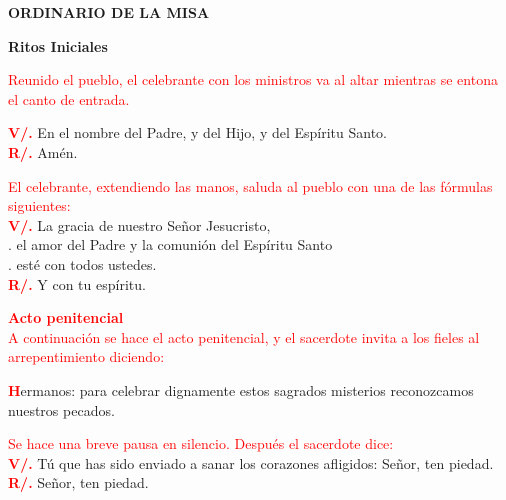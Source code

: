 \documentclass[12pt, letterpaper]{article}
\begin{document}

  \begin{center}
    \Huge {\bfseries ORDINARIO DE LA MISA}
  \end{center}

  \begin{center}
    \Huge {\bfseries Ritos Iniciales}
  \end{center}

  \large {\textcolor{red}{Reunido el pueblo, el celebrante con los ministros va al altar mientras se entona el canto de entrada.}}

  \noindent
  \Large {\bfseries \textcolor{red}{V/.}} \hspace{1cm} {En el nombre del Padre, y del Hijo, \Huge{\textcolor{red}{}} \Large y del Esp\'iritu Santo.}\\
  \noindent
  \Large{{\bfseries \textcolor{red}{R/.}} \hspace{1cm} Am\'en.}

  \large {\textcolor{red}{El celebrante, extendiendo las manos, saluda al pueblo con una de las f\'ormulas siguientes:}}\\
  \Large {\bfseries \textcolor{red}{V/.}} \hspace{1cm} La gracia de nuestro Se\~nor Jesucristo,\\
  . \hspace{1.9cm} el amor del Padre y la comuni\'on del Esp\'iritu Santo\\
  . \hspace{1.9cm} est\'e con todos ustedes.\\
  \noindent
  {\bfseries \textcolor{red}{R/.}} \hspace{1cm} \Large Y con tu esp\'iritu.

  \large {\bfseries \textcolor{red}{Acto penitencial}}\\
  \large {\textcolor{red}{A continuaci\'on se hace el acto penitencial, y el sacerdote invita a los fieles al arrepentimiento
  diciendo:}}

  \lettrine[lines=2]{\bfseries \textcolor{red}{H}}{}\Large {ermanos: para celebrar dignamente estos sagrados misterios reconozcamos nuestros pecados.}

  \large {\textcolor{red}{Se hace una breve pausa en silencio. Despu\'es el sacerdote dice:}}\\
  \Large {\bfseries \textcolor{red}{V/.}} \hspace{1cm} T\'u que has sido enviado a sanar los corazones afligidos: Se\~nor, ten piedad.\\
  \noindent
  \Large {\bfseries \textcolor{red}{R/.}} \hspace{1cm} Se\~nor, ten piedad. 
\end{document}
